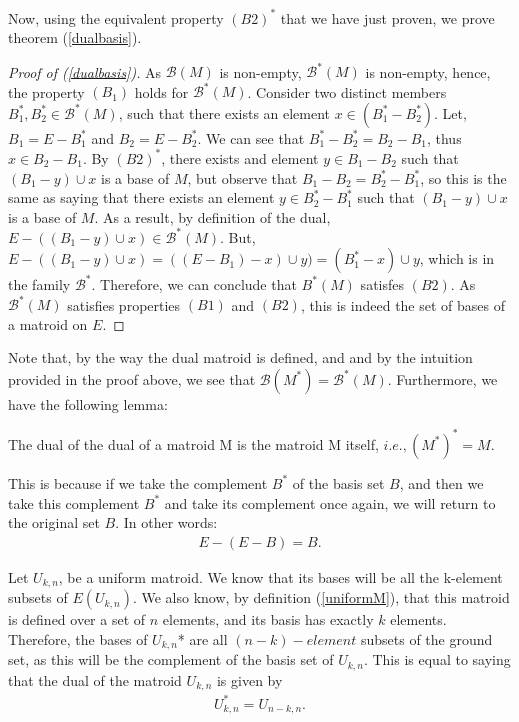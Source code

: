 Now, using the equivalent property $(B2)^*$ that we have just proven, we prove theorem (\ref{dualbasis}).
\begin{proof}[Proof of (\ref{dualbasis})]
    As $\mathcal{B}(M)$ is non-empty, $\mathcal{B}^*(M)$ is non-empty, hence, the property $(B_1)$ holds for $\mathcal{B}^*(M)$. 
    Consider two distinct members $B^* _1 , B ^* _2 \in \mathcal{B}^*(M)$, such that there exists an element $x \in (B^*_1 - B^*_2)$. Let, $B_1 = E - B^*_1$ and $B_2 = E - B^*_2$. We can see that $B^*_1 - B^*_2 = B_2 - B_1$, thus $x \in B_2 - B_1$. By ${(B2)}^*$, there exists and element $y \in  B_1 - B_2$ such that $(B_1 - y)\cup x$ is a base of $M$, but observe that $B_1 - B_2 = B^*_2 - B^*_1$, so this is the same as saying that there exists an element $y \in  B^*_2 - B^*_1$ such that $(B_1 - y)\cup x$ is a base of $M$. As a result, by definition of the dual, $E-((B_1 - y)\cup x) \in \mathcal{B}^*(M)$. But, $E-((B_1 - y)\cup x) = ((E-B_1)-x)\cup y) = (B_1^* - x)\cup y$, which is in the family $\mathcal{B}^*$. Therefore, we can conclude that $B^*(M)$ satisfes $(B2)$. As $\mathcal{B}^*(M)$ satisfies  properties $(B1)$ and $(B2)$, this is indeed the set of bases of a matroid on $E$.
\end{proof}

Note that, by the way the dual matroid is defined, and and by the intuition provided in the proof above, we see that $\mathcal{B}(M^*)=\mathcal{B}^*(M)$. Furthermore, we have the following lemma:

\begin{lemma}
    The dual of the dual of a matroid M is the matroid M itself, $i.e., (M^*)^* = M$.
\end{lemma}

This is because if we take the complement $B^*$ of the basis set $B$, and then we take this complement $B^*$ and take its complement once again, we will return to the original set $B$. In other words:
\begin{align*}
E-(E - B) = B.
\end{align*}

\begin{exmp}
    Let $U_{k,n}$, be a uniform matroid. We know that its bases will be all the k-element subsets of $E(U_{k,n})$. We also know, by definition (\ref{uniformM}), that this matroid is defined over a set of $n$ elements, and its basis has exactly $k$ elements. Therefore, the bases of $U_{k,n}$* are all $(n-k)-element$ subsets of the ground set, as this will be the complement of the basis set of $U_{k,n}$. This is equal to saying that the dual of the matroid $U_{k,n}$ is given by 
    \begin{align*}
    U_{k,n} ^*  = U_{n-k,n}.
    \end{align*}
\end{exmp}


